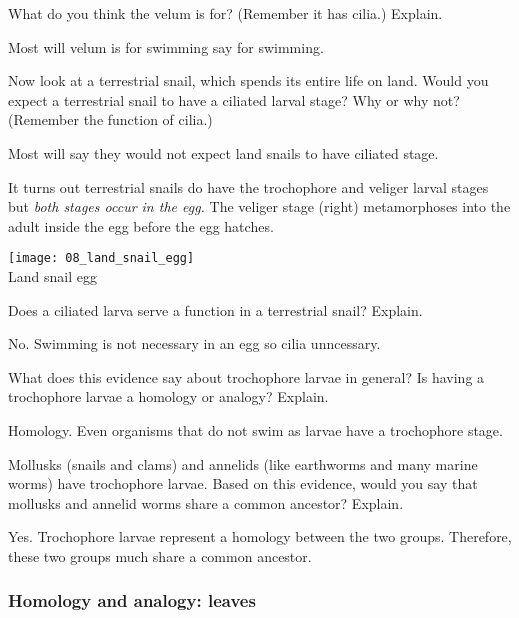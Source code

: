 \documentclass[12pt, hidelinks]{exam}
\newcommand*\AnswerBox[2]{%
    \parbox[t][#1]{0.92\textwidth}{%
    \begin{solution}#2\end{solution}}
    \vspace{\stretch{1}}
}
\begin{document}
\begin{questions}
\question
What do you think the velum is for? (Remember it has cilia.) Explain.

\AnswerBox{4\baselineskip}{Most will velum is for swimming say for swimming.}


\question
Now look at a terrestrial snail, which spends its
entire life on land. Would you expect a terrestrial snail to
have a ciliated larval stage? Why or why not? (Remember the
function of cilia.)

\AnswerBox{4\baselineskip}{Most will say they would not expect land snails to have ciliated stage.}

\begin{minipage}{0.75\textwidth}%
It turns out terrestrial snails do have the
trochophore and veliger larval stages but \emph{both stages occur in the egg.} The veliger stage (right)
metamorphoses into the adult inside the egg before the egg hatches. 
\end{minipage}\hfill
\begin{minipage}{0.25\textwidth}%
\centering\texttt{[image: 08\_land\_snail\_egg]}\\
{\footnotesize Land snail egg}
\end{minipage}

\question
Does a ciliated larva serve a function in a terrestrial snail? Explain.

\AnswerBox{4\baselineskip}{No. Swimming is not necessary in an egg so cilia unncessary.}

\question
What does this evidence say about trochophore larvae in
general? Is having a trochophore larvae a homology or analogy? Explain.

\AnswerBox{4\baselineskip}{Homology. Even organisms that do not swim as larvae have a trochophore stage. }


\question
Mollusks (snails and clams) and annelids (like earthworms and many marine worms) have trochophore larvae. Based on this evidence, would you say that mollusks and annelid worms share a common ancestor? Explain.

\AnswerBox{3\baselineskip}{Yes. Trochophore larvae represent a homology between the two groups. Therefore, these two groups much share a common ancestor. }

\newpage

\subsubsection*{Homology and analogy: leaves}


\end{questions}
\end{document}
